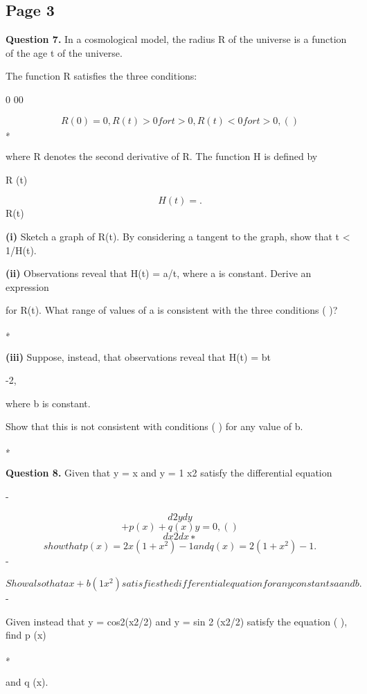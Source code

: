 \documentclass[12pt]{article}
\begin{document}
\subsection*{Page 3}
\begin{flushleft}
\bigskip\textbf{Question 7.} In a cosmological model, the radius R of the universe is a function of the age t of the universe.\par
The function R satisfies the three conditions:\par
0 00\par
\[R(0) = 0, R (t) > 0 for t > 0, R (t) < 0 for t > 0, ( )\]
∗\par
where R denotes the second derivative of R. The function H is defined by\par
R (t)\par
\[H(t) = .\]
R(t)\par
\textbf{(i)} Sketch a graph of R(t). By considering a tangent to the graph, show that t < 1/H(t).\par
\textbf{(ii)} Observations reveal that H(t) = a/t, where a is constant. Derive an expression\par
for R(t). What range of values of a is consistent with the three conditions ( )?\par
∗\par
\textbf{(iii)} Suppose, instead, that observations reveal that H(t) = bt\par
-2,\par
where b is constant.\par
Show that this is not consistent with conditions ( ) for any value of b.\par
∗\par
\bigskip\textbf{Question 8.} Given that y = x and y = 1 x2 satisfy the differential equation\par
-\par
\[d2y dy\]
\[+ p (x) + q (x)y = 0 , ( )\]
\[dx2 dx ∗\]
\[show that p (x) = 2x(1 + x^2) -1 and q (x) = 2(1 + x^2) -1.\]
-\par
\[Show also that ax + b(1 x^2) satisfies the differential equation for any constants a and b.\]
-\par
Given instead that y = cos2(x2/2) and y = sin 2 (x2/2) satisfy the equation ( ), find p (x)\par
∗\par
and q (x).\par
\end{flushleft}
\end{document}
